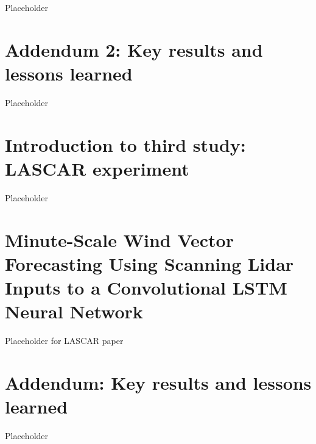 Placeholder

\clearpage
\section{Addendum 2: Key results and lessons learned}
\label{sec:balcony_addendum2}

Placeholder


\clearpage
\section{Introduction to third study: LASCAR experiment}
\label{sec:lascar_intro}

Placeholder


\clearpage
\section{Minute-Scale Wind Vector Forecasting Using Scanning Lidar Inputs to a Convolutional LSTM Neural Network}
\label{sec:lascar_paper}

Placeholder for LASCAR paper
%

\clearpage
\section{Addendum: Key results and lessons learned}
\label{sec:lascar_addendum}

Placeholder